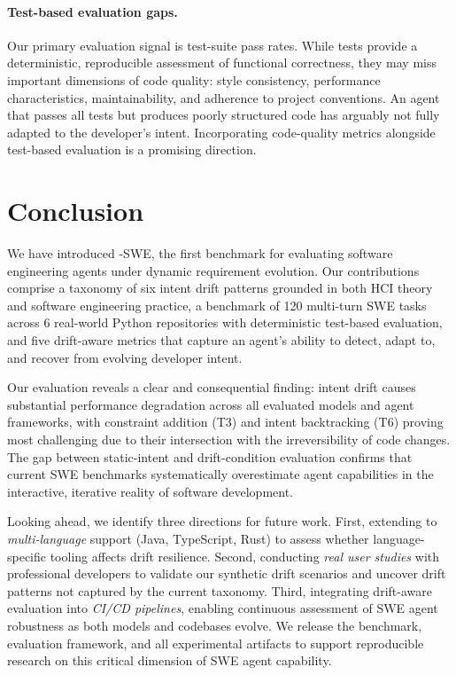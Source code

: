 \paragraph{Test-based evaluation gaps.}
Our primary evaluation signal is test-suite pass rates. While tests provide a deterministic, reproducible assessment of functional correctness, they may miss important dimensions of code quality: style consistency, performance characteristics, maintainability, and adherence to project conventions. An agent that passes all tests but produces poorly structured code has arguably not fully adapted to the developer's intent. Incorporating code-quality metrics alongside test-based evaluation is a promising direction.


\section{Conclusion}
\label{sec:conclusion}

We have introduced \drift{}-SWE, the first benchmark for evaluating software engineering agents under dynamic requirement evolution. Our contributions comprise a taxonomy of six intent drift patterns grounded in both HCI theory and software engineering practice, a benchmark of 120 multi-turn SWE tasks across 6 real-world Python repositories with deterministic test-based evaluation, and five drift-aware metrics that capture an agent's ability to detect, adapt to, and recover from evolving developer intent.

Our evaluation reveals a clear and consequential finding: intent drift causes substantial performance degradation across all evaluated models and agent frameworks, with constraint addition (T3) and intent backtracking (T6) proving most challenging due to their intersection with the irreversibility of code changes. The gap between static-intent and drift-condition evaluation confirms that current SWE benchmarks systematically overestimate agent capabilities in the interactive, iterative reality of software development.

Looking ahead, we identify three directions for future work. First, extending \bench{} to \emph{multi-language} support (Java, TypeScript, Rust) to assess whether language-specific tooling affects drift resilience. Second, conducting \emph{real user studies} with professional developers to validate our synthetic drift scenarios and uncover drift patterns not captured by the current taxonomy. Third, integrating drift-aware evaluation into \emph{CI/CD pipelines}, enabling continuous assessment of SWE agent robustness as both models and codebases evolve. We release the benchmark, evaluation framework, and all experimental artifacts to support reproducible research on this critical dimension of SWE agent capability.
